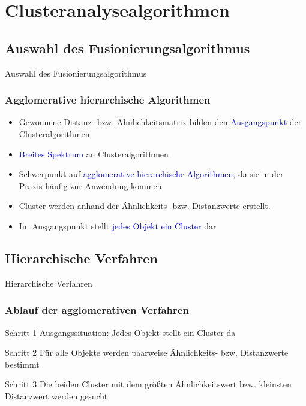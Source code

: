 \documentclass{beamer}
\begin{document}
\section{Clusteranalysealgorithmen}

\subsection{Auswahl des Fusionierungsalgorithmus}

\begin{frame}
 \centerline{Auswahl des Fusionierungsalgorithmus}
\end{frame}

\begin{frame}
 \frametitle{Agglomerative hierarchische Algorithmen}
 \begin{itemize}
  \item Gewonnene Distanz- bzw. Ähnlichkeitsmatrix bilden den \textcolor{blue}{Ausgangspunkt} der Clusteralgorithmen
  \item \textcolor{blue}{Breites Spektrum} an Clusteralgorithmen
  \item Schwerpunkt auf \textcolor{blue}{agglomerative hierarchische Algorithmen}, da sie in der Praxis häufig zur Anwendung kommen
  \item Cluster werden anhand der Ähnlichkeits- bzw. Distanzwerte erstellt.
  \item Im Ausgangspunkt stellt \textcolor{blue}{jedes Objekt ein Cluster} dar 

 \end{itemize}
\end{frame}

\subsection{Hierarchische Verfahren}

\begin{frame}
 \centerline{Hierarchische Verfahren}
\end{frame}

\begin{frame}
 \frametitle{Ablauf der agglomerativen Verfahren}

 \begin{block}{Schritt 1}
  Ausgangssituation: Jedes Objekt stellt ein Cluster da
 \end{block}

 \begin{block}{Schritt 2}
  Für alle Objekte werden paarweise Ähnlichkeits- bzw. Distanzwerte bestimmt
 \end{block}

 \begin{block}{Schritt 3}
  Die beiden Cluster mit dem größten Ähnlichkeitswert bzw. kleinsten Distanzwert werden gesucht
 \end{block}


\end{frame}
\end{document}
